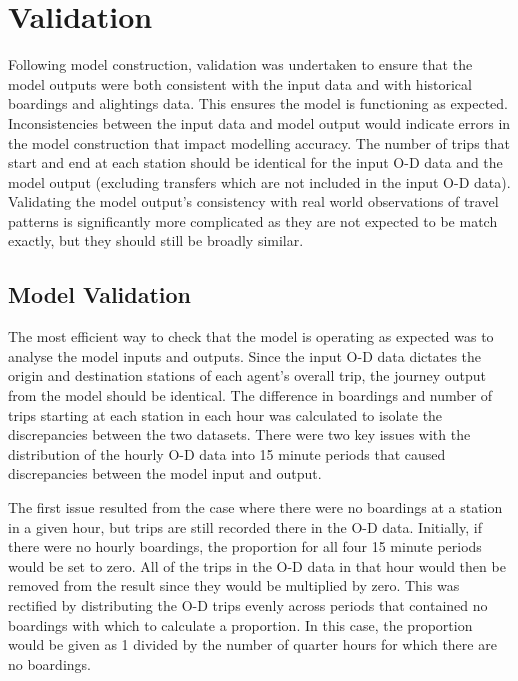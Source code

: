 \section{Validation}
\label{sec:validation}
Following model construction, validation was undertaken to ensure that the model outputs were both consistent with the input data and with historical boardings and alightings data. This ensures the model is functioning as expected. Inconsistencies between the input data and model output would indicate errors in the model construction that impact modelling accuracy. The number of trips that start and end at each station should be identical for the input O-D data and the model output (excluding transfers which are not included in the input O-D data). Validating the model output's consistency with real world observations of travel patterns is significantly more complicated as they are not expected to be match exactly, but they should still be broadly similar. 

\subsection{Model Validation}
\label{subsec:validation_model}
The most efficient way to check that the model is operating as expected was to analyse the model inputs and outputs. Since the input O-D data dictates the origin and destination stations of each agent's overall trip, the journey output from the model should be identical. The difference in boardings and number of trips starting at each station in each hour was calculated to isolate the discrepancies between the two datasets. There were two key issues with the distribution of the hourly O-D data into 15 minute periods that caused discrepancies between the model input and output. 

The first issue resulted from the case where there were no boardings at a station in a given hour, but trips are still recorded there in the O-D data. Initially, if there were no hourly boardings, the proportion for all four 15 minute periods would be set to zero. All of the trips in the O-D data in that hour would then be removed from the result since they would be multiplied by zero. This was rectified by distributing the O-D trips evenly across periods that contained no boardings with which to calculate a proportion. In this case, the proportion would be given as 1 divided by the number of quarter hours for which there are no boardings. 

